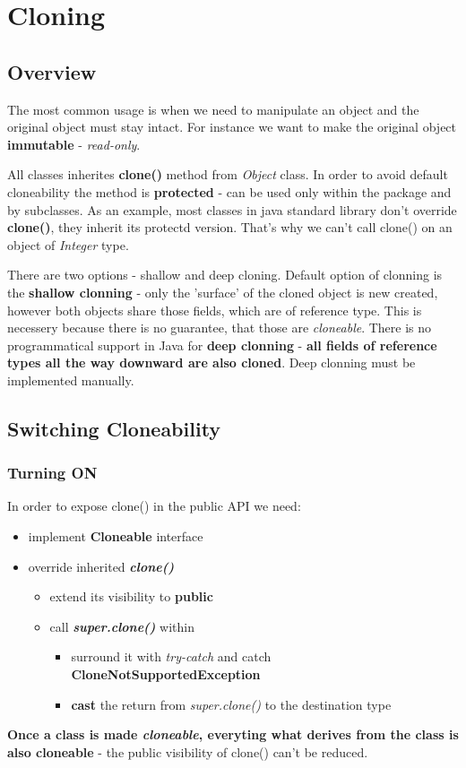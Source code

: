 \documentclass{report}
\begin{document}
\section{Cloning}
\subsection{Overview}
The most common usage is when we need to manipulate an object and the original object must stay intact. For instance we want to make 
the original object \textbf{immutable} - \textit{read-only}.

All classes inherites \textbf{clone()} method from \textit{Object} class. In order to avoid default cloneability the method is \textbf{protected} - can be used 
only within the package and by subclasses. As an example, most classes in java standard library don't override \textbf{clone()}, they inherit its protectd version.
That's why we can't call clone() on an object of \textit{Integer} type.

There are two options - shallow and deep cloning. Default option of clonning is the \textbf{shallow clonning} - only the 'surface' of the cloned object is new created,
however both objects share those fields, which are of reference type. This is necessery because there is no guarantee, that those  are \textit{cloneable}.
There is no programmatical support in Java for \textbf{deep clonning} - \textbf{all fields of reference types all the way downward are also cloned}. Deep clonning
must be implemented manually.

\subsection{Switching Cloneability}
\subsubsection{Turning ON}
In order to expose clone() in the public API we need:
\begin{itemize}
	\item implement \textbf{Cloneable} interface
	\item override inherited \textit{\textbf{clone()}}
	\begin{itemize}
		\item extend its visibility to \textbf{public}
		\item call \textbf{\textit{super.clone()}} within
		\begin{itemize}
			\item surround it with \textit{try-catch} and catch \textbf{CloneNotSupportedException}
			\item \textbf{cast} the return from \textit{super.clone()} to the destination type
		\end{itemize}
	\end{itemize}
\end{itemize}
\textbf{Once a class is made \textit{cloneable}, everyting what derives from the class is also cloneable} - the public visibility of clone() can't
be reduced.
\end{document}
